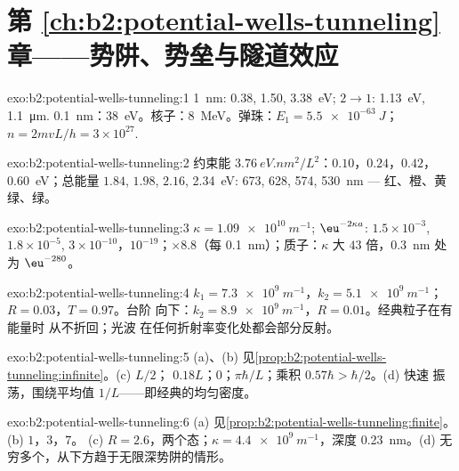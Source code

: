 \section*{第 \ref{ch:b2:potential-wells-tunneling} 章——势阱、势垒与隧道效应}

\begin{solution}{exo:b2:potential-wells-tunneling:1}
\qty{1}{nm}: \qty{0.38}{}, \qty{1.50}{}, \qty{3.38}{eV}; $2 \to 1$: \qty{1.13}{eV}, \qty{1.1}{\micro m}.
\qty{0.1}{nm}：\qty{38}{eV}。核子：\qty{8}{MeV}。弹珠：$E_1 = \qty{5.5e-63}{J}$；
$n = 2mvL/h = 3 \times 10^{27}$.
\end{solution}

\begin{solution}{exo:b2:potential-wells-tunneling:2}
约束能 $\qty{3.76}{eV.nm^2}/L^2$：$0.10$，$0.24$，$0.42$，\qty{0.60}{eV}；总能量
$1.84$, $1.98$, $2.16$, \qty{2.34}{eV}: \qty{673}{}, \qty{628}{}, \qty{574}{}, \qty{530}{nm} ---
红、橙、黄绿、绿。
\end{solution}

\begin{solution}{exo:b2:potential-wells-tunneling:3}
$\kappa = \qty{1.09e10}{m^{-1}}$; $\eu^{-2\kappa a}$: $1.5 \times 10^{-3}$, $1.8 \times 10^{-5}$,
$3 \times 10^{-10}$，$10^{-19}$；$\times 8.8$（每 \qty{0.1}{nm}）；质子：$\kappa$ 大
$43$ 倍，\qty{0.3}{nm} 处为 $\eu^{-280}$。
\end{solution}

\begin{solution}{exo:b2:potential-wells-tunneling:4}
$k_1 = \qty{7.3e9}{m^{-1}}$，$k_2 = \qty{5.1e9}{m^{-1}}$；$R = 0.03$，$T = 0.97$。台阶
向下：$k_2 = \qty{8.9e9}{m^{-1}}$，$R = 0.01$。经典粒子在有能量时
从不折回；光波
在任何折射率变化处都会部分反射。
\end{solution}

\begin{solution}{exo:b2:potential-wells-tunneling:5}
(a)、(b) 见\cref{prop:b2:potential-wells-tunneling:infinite}。(c) $L/2$；
$0.18L$；$0$；$\pi\hbar/L$；乘积 $0.57\hbar > \hbar/2$。(d) 快速
振荡，围绕平均值 $1/L$——即经典的均匀密度。
\end{solution}

\begin{solution}{exo:b2:potential-wells-tunneling:6}
(a) 见\cref{prop:b2:potential-wells-tunneling:finite}。(b) $1$，$3$，$7$。
(c) $R = 2.6$，两个态；$\kappa = \qty{4.4e9}{m^{-1}}$，深度 \qty{0.23}{nm}。(d)
无穷多个，从下方趋于无限深势阱的情形。
\end{solution}

